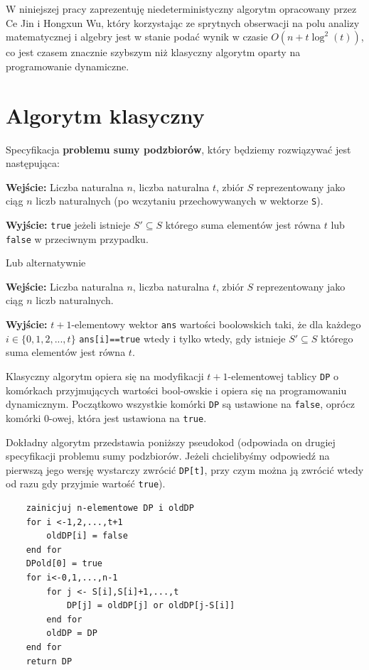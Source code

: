 \documentclass{article}
\begin{document}
W niniejszej pracy zaprezentuję niedeterministyczny algorytm opracowany przez Ce Jin 
i Hongxun Wu, który korzystając ze sprytnych obserwacji na polu analizy matematycznej i algebry jest w 
stanie podać wynik w czasie $O(n+t\log^2(t))$, co jest czasem znacznie szybszym niż klasyczny algorytm 
oparty na programowanie dynamiczne. 



\section{Algorytm klasyczny}
Specyfikacja \textbf{problemu sumy podzbiorów}, który będziemy rozwiązywać jest następująca:

\begin{tcolorbox}
    \textbf{Wejście:} Liczba naturalna $n$, liczba naturalna $t$, zbiór $S$ reprezentowany jako ciąg $n$ liczb naturalnych 
    (po wczytaniu 
    przechowywanych w wektorze \texttt{S}).
    
    \textbf{Wyjście:} \texttt{true} jeżeli istnieje $S' \subseteq S$ którego suma elementów jest równa $t$ lub 
    \texttt{false} w przeciwnym przypadku.
\end{tcolorbox}
Lub alternatywnie
\begin{tcolorbox}
    \textbf{Wejście:} Liczba naturalna $n$, liczba naturalna $t$, zbiór $S$ reprezentowany jako ciąg $n$ liczb naturalnych.
    
    \textbf{Wyjście:} $t+1$-elementowy wektor \texttt{ans} wartości boolowskich taki, że dla każdego
    $i \in \{0,1,2,...,t\}$ \texttt{ans[i]==true} wtedy i tylko wtedy, gdy
    istnieje $S' \subseteq S$ którego suma elementów jest równa $t$.
\end{tcolorbox}


Klasyczny algorytm opiera się na modyfikacji $t+1$-elementowej tablicy \texttt{DP} o komórkach przyjmujących wartości bool-owskie i 
opiera się na programowaniu dynamicznym. Początkowo wszystkie komórki \texttt{DP} są ustawione na \texttt{false}, oprócz komórki 
$0$-owej, która
jest ustawiona na \texttt{true}.

Dokładny algorytm przedstawia poniższy pseudokod (odpowiada on drugiej specyfikacji problemu sumy podzbiorów. Jeżeli chcielibyśmy
odpowiedź na pierwszą jego wersję wystarczy zwrócić \texttt{DP[t]}, przy czym można ją zwrócić wtedy od razu gdy przyjmie 
wartość \texttt{true}).
\begin{verbatim}
    zainicjuj n-elementowe DP i oldDP
    for i <-1,2,...,t+1
        oldDP[i] = false
    end for 
    DPold[0] = true
    for i<-0,1,...,n-1
        for j <- S[i],S[i]+1,...,t
            DP[j] = oldDP[j] or oldDP[j-S[i]]
        end for
        oldDP = DP
    end for
    return DP
\end{verbatim}
\end{document}
